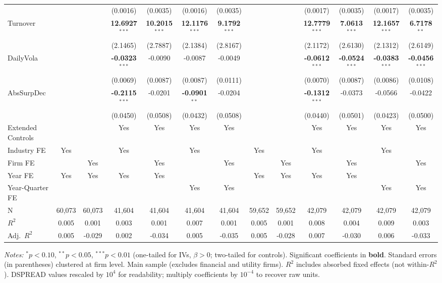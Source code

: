\documentclass[11pt,a4paper]{article}
\begin{document}
\begin{table}[htbp]
\begin{tabular}{lcccccccccccc}
 &  &  & (0.0016) & (0.0035) & (0.0016) & (0.0035) &  &  & (0.0017) & (0.0035) & (0.0017) & (0.0035) \\
Turnover &  &  & \textbf{12.6927}$^{***}$ & \textbf{10.2015}$^{***}$ & \textbf{12.1176}$^{***}$ & \textbf{9.1792}$^{***}$ &  &  & \textbf{12.7779}$^{***}$ & \textbf{7.0613}$^{***}$ & \textbf{12.1657}$^{***}$ & \textbf{6.7178}$^{**}$ \\
 &  &  & (2.1465) & (2.7887) & (2.1384) & (2.8167) &  &  & (2.1172) & (2.6130) & (2.1312) & (2.6149) \\
DailyVola &  &  & \textbf{-0.0323}$^{***}$ & -0.0090 & -0.0087 & -0.0049 &  &  & \textbf{-0.0612}$^{***}$ & \textbf{-0.0524}$^{***}$ & \textbf{-0.0383}$^{***}$ & \textbf{-0.0456}$^{***}$ \\
 &  &  & (0.0069) & (0.0087) & (0.0087) & (0.0111) &  &  & (0.0070) & (0.0087) & (0.0086) & (0.0108) \\
AbsSurpDec &  &  & \textbf{-0.2115}$^{***}$ & -0.0201 & \textbf{-0.0901}$^{**}$ & -0.0204 &  &  & \textbf{-0.1312}$^{***}$ & -0.0373 & -0.0566 & -0.0422 \\
 &  &  & (0.0450) & (0.0508) & (0.0432) & (0.0508) &  &  & (0.0440) & (0.0501) & (0.0423) & (0.0500) \\
\midrule
Extended Controls &  &  & Yes & Yes & Yes & Yes &  &  & Yes & Yes & Yes & Yes \\
Industry FE & Yes &  & Yes &  & Yes &  & Yes &  & Yes &  & Yes &  \\
Firm FE &  & Yes &  & Yes &  & Yes &  & Yes &  & Yes &  & Yes \\
Year FE & Yes & Yes & Yes & Yes &  &  & Yes & Yes & Yes & Yes &  &  \\
Year-Quarter FE &  &  &  &  & Yes & Yes &  &  &  &  & Yes & Yes \\
\midrule
N & 60,073 & 60,073 & 41,604 & 41,604 & 41,604 & 41,604 & 59,652 & 59,652 & 42,079 & 42,079 & 42,079 & 42,079 \\
$R^2$ & 0.005 & 0.001 & 0.003 & 0.001 & 0.007 & 0.001 & 0.005 & 0.001 & 0.008 & 0.004 & 0.009 & 0.003 \\
Adj.~$R^2$ & 0.005 & -0.029 & 0.002 & -0.034 & 0.005 & -0.035 & 0.005 & -0.028 & 0.007 & -0.030 & 0.006 & -0.033 \\
\bottomrule
\end{tabular}
\begin{minipage}{\linewidth}
\vspace{2pt}\scriptsize
\textit{Notes:} $^{*}p<0.10$, $^{**}p<0.05$, $^{***}p<0.01$ (one-tailed for IVs, $\beta > 0$; two-tailed for controls).
 Significant coefficients in \textbf{bold}.
 Standard errors (in parentheses) clustered at firm level.
 Main sample (excludes financial and utility firms).
 $R^2$ includes absorbed fixed effects (not within-$R^2$).
 DSPREAD values rescaled by $10^4$ for readability; multiply coefficients by $10^{-4}$ to recover raw units.
\end{minipage}
\end{table}
\end{document}
